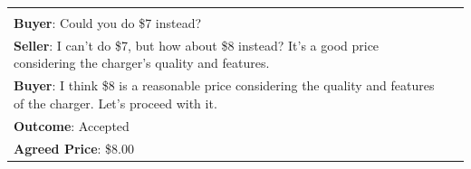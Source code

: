 \documentclass[11pt]{article}
\begin{document}
\begin{table}[h]
\begin{tabular}{|p{7cm}|p{7cm}|}
\begin{minipage}[t]{6.8cm}
    \textbf{Seller}: I can't do \$6, but how about \$8 instead? \\
    \textbf{Buyer}: Could you do \$7 instead? \\
    \textbf{Seller}: I can't do \$7, but how about \$8 instead? It's a good price considering the charger's quality and features. \\
    \textbf{Buyer}: I think \$8 is a reasonable price considering the quality and features of the charger. Let's proceed with it. \\
    \textbf{Outcome}: Accepted \\
    \textbf{Agreed Price}: \$8.00
    \end{minipage}
    \\ \hline
\end{tabular}
\end{table}
\end{document}
